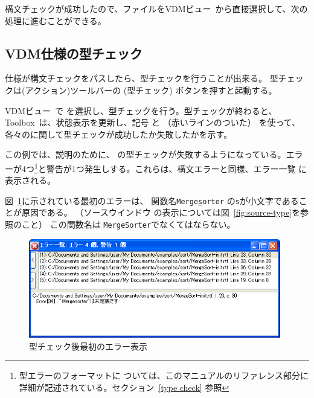 \documentclass[\pformat,12pt]{jarticle}
\newcommand{\Toolbox}{Toolbox}
\newcommand{\vdmModView}{\guicmd{VDMビュー}}
\newcommand{\guicmd}[1]{{\gt #1}}
\begin{document}
構文チェックが成功したので、ファイルを\vdmModView\ から直接選択して、次の処理に進むことができる。

\subsection{VDM仕様の型チェック}
\label{sec:gde-tc}


仕様が構文チェックをパスしたら、型チェックを行うことが出来る。
型チェックは(\guicmd{アクション})ツールバーの  
(\guicmd{型チェック}) ボタンを押すと起動する。

\vdmModView\ で  
を選択し、型チェックを行う。型チェックが終わると、 \Toolbox\ は、状態表示を更新し、記号
と
（赤いラインのついた）
を使って、各々のに関して型チェックが成功したか失敗したかを示す。

この例では、説明のために、
の型チェックが失敗するようになっている。エラーが4つ\footnote{型エラーのフォーマットに
ついては、このマニュアルのリファレンス部分に詳細が記述されている。セクション~\ref{type check}
参照}と警告が1つ発生しする。これらは、構文エラーと同様、\guicmd{エラー一覧} に表示される。

図~\ref{fig:type_error1}に示されている最初のエラーは、
関数名{\tt Merge\underline{s}orter} の{\tt s}が小文字であることが原因である。
（\guicmd{ソースウインドウ} の表示については図~\ref{fig:source-type}を参照のこと）
この関数名は {\tt MergeSorter}でなくてはならない。


\begin{figure}[tbh]
\begin{center}
\includegraphics[width=11cm]{typeError1-pp.png}
\caption{型チェック後最初のエラー表示}
\label{fig:type_error1}
\end{center}
\end{figure}
\end{document}
